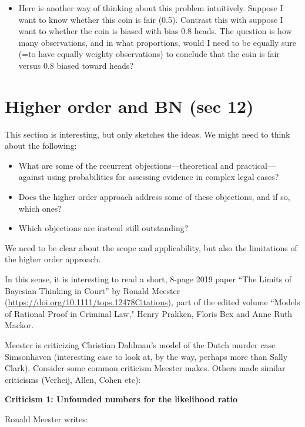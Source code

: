 \documentclass[
  10pt,
  dvipsnames,enabledeprecatedfontcommands]{scrartcl}
\begin{document}
\begin{itemize}
\item Here is another way of thinking about this problem intuitively. Suppose I want to know whether 
this coin is fair (0.5). Contrast this with suppose I want to whether the coin is biased with bias 0.8 heads.
The question is how many observations, and in what proportions, would I need to be equally sure (=to have equally weighty observations) to conclude that the coin is fair versus 0.8 biased toward heads?

\end{itemize}

\hypertarget{higher-order-and-bn-sec-12}{%
\section{Higher order and BN (sec
12)}\label{higher-order-and-bn-sec-12}}

This section is interesting, but only sketches the ideas. We might need
to think about the following:

\begin{itemize}
\item What are some of the recurrent objections---theoretical and practical---against using probabilities for assessing evidence in complex legal cases?
\item Does the higher order approach address some of these objections, and if so, which ones?
\item Which objections are instead still outstanding? 
\end{itemize}

We need to be clear about the scope and applicability, but also the
limitations of the higher order approach.

In this sense, it is interesting to read a short, 8-page 2019 paper
``The Limits of Bayesian Thinking in Court'' by Ronald Meester
(\url{https://doi.org/10.1111/tops.12478Citations}), part of the edited
volume ``Models of Rational Proof in Criminal Law," Henry Prakken,
Floris Bex and Anne Ruth Mackor.

Meester is criticizing Christian Dahlman's model of the Dutch murder
case Simsonhaven (interesting case to look at, by the way, perhaps more
than Sally Clark). Consider some common criticism Meester makes. Others
made similar criticisms (Verheij, Allen, Cohen etc):

\textbf{Criticism 1: Unfounded numbers for the likelihood ratio}

Ronald Meester writes:
\end{document}
